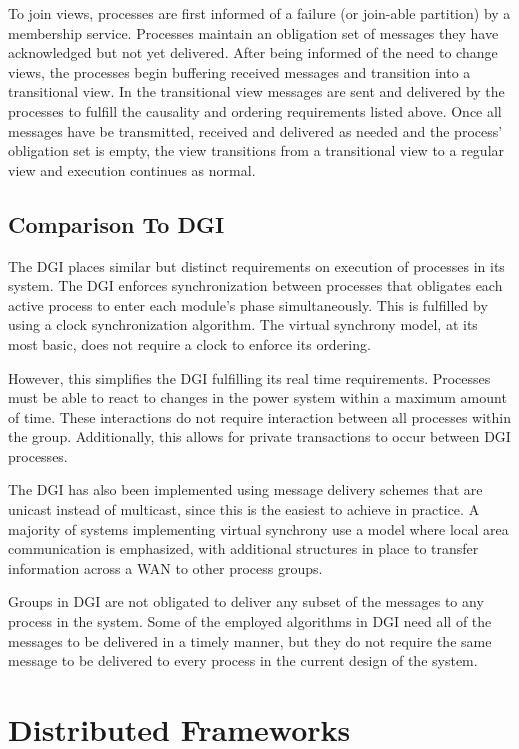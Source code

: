 To join views, processes are first informed of a failure (or join-able partition) by a membership service. Processes maintain an obligation set of messages they have acknowledged but not yet delivered. After being informed of the need to change views, the processes begin buffering received messages and transition into a transitional view. In the transitional view messages are sent and delivered by the processes to fulfill the causality and ordering requirements listed above. Once all messages have be transmitted, received and delivered as needed and the process' obligation set is empty, the view transitions from a transitional view to a regular view and execution continues as normal.

\subsection{Comparison To DGI}

The DGI places similar but distinct requirements on execution of processes in its system. The DGI enforces synchronization between processes that obligates each active process to enter each module's phase simultaneously. This is fulfilled by using a clock synchronization algorithm. The virtual synchrony model, at its most basic, does not require a clock to enforce its ordering.

However, this simplifies the DGI fulfilling its real time requirements.  Processes must be able to react to changes in the power system within a maximum amount of time. These interactions do not require interaction between all processes within the group. Additionally, this allows for private transactions to occur between DGI processes. 

The DGI has also been implemented using message delivery schemes that are unicast instead of multicast, since this is the easiest to achieve in practice. A majority of systems implementing virtual synchrony use a model where local area communication is emphasized, with additional structures in place to transfer information across a WAN to other process groups.

Groups in DGI are not obligated to deliver any subset of the messages to any process in the system. Some of the employed algorithms in DGI need all of the messages to be delivered in a timely manner, but they do not require the same message to be delivered to every process in the current design of the system.

\section{Distributed Frameworks}

